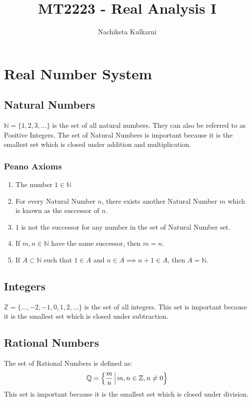 \documentclass[12pt, oneside]{book}
\date{}
\title{MT2223 - Real Analysis I}
\author{Nachiketa Kulkarni}
\begin{document}
\maketitle
\tableofcontents

\mainmatter
\chapter{Real Number System}
\section{Natural Numbers}
\( \mathbb{N} = \{ 1,2,3,\dots \} \) is the set of all natural numbers.
They can also be referred to as Positive Integers.
The set of Natural Numbers is important because it is the smallest set which is closed under addition and multiplication.

\subsection{Peano Axioms}
\begin{enumerate}
	\item The number \(1 \in \mathbb{N}\)
	\item For every Natural Number \(n\), there exists another Natural Number \(m\) which is known as the successor of \(n\).
	\item \(1\) is not the successor for any number in the set of Natural Number set.
	\item If \(m,n \in \mathbb{N}\) have the same successor, then \(m=n\).
	\item If \(A \subset \mathbb{N}\) such that \(1 \in A\) and \(n \in A \implies n+1 \in A\), then \(A = \mathbb{N}\).
\end{enumerate}

\section{Integers}
\( \mathbb{Z} = \{ \dots, -2, -1, 0, 1, 2, \dots \} \) is the set of all integers.
This set is important because it is the smallest set which is closed under subtraction.

\section{Rational Numbers}
The set of Rational Numbers is defined as:
\[ \mathbb{Q} = \left\{ \frac{m}{n} \; \vline \; m,n \in \mathbb{Z}, n \neq 0 \right\} \]
This set is important because it is the smallest set which is closed under division.
\end{document}
